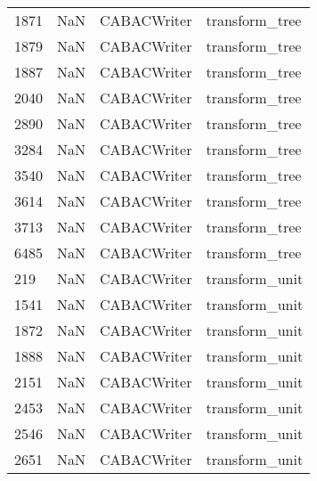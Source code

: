 \begin{tabular}{llll}
1871 &                   NaN &                CABACWriter &                            transform\_tree \\
1879 &                   NaN &                CABACWriter &                            transform\_tree \\
1887 &                   NaN &                CABACWriter &                            transform\_tree \\
2040 &                   NaN &                CABACWriter &                            transform\_tree \\
2890 &                   NaN &                CABACWriter &                            transform\_tree \\
3284 &                   NaN &                CABACWriter &                            transform\_tree \\
3540 &                   NaN &                CABACWriter &                            transform\_tree \\
3614 &                   NaN &                CABACWriter &                            transform\_tree \\
3713 &                   NaN &                CABACWriter &                            transform\_tree \\
6485 &                   NaN &                CABACWriter &                            transform\_tree \\
219  &                   NaN &                CABACWriter &                            transform\_unit \\
1541 &                   NaN &                CABACWriter &                            transform\_unit \\
1872 &                   NaN &                CABACWriter &                            transform\_unit \\
1888 &                   NaN &                CABACWriter &                            transform\_unit \\
2151 &                   NaN &                CABACWriter &                            transform\_unit \\
2453 &                   NaN &                CABACWriter &                            transform\_unit \\
2546 &                   NaN &                CABACWriter &                            transform\_unit \\
2651 &                   NaN &                CABACWriter &                            transform\_unit \\

\end{tabular}
